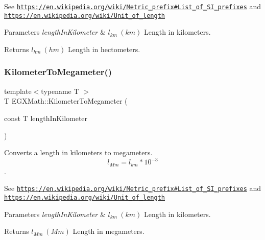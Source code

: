 See \href{https://en.wikipedia.org/wiki/Metric_prefix#List_of_SI_prefixes}{\tt https\+://en.\+wikipedia.\+org/wiki/\+Metric\+\_\+prefix\#\+List\+\_\+of\+\_\+\+S\+I\+\_\+prefixes} and \href{https://en.wikipedia.org/wiki/Unit_of_length}{\tt https\+://en.\+wikipedia.\+org/wiki/\+Unit\+\_\+of\+\_\+length} 
\begin{DoxyParams}{Parameters}
{\em length\+In\+Kilometer} & $ l_{km}\ (km)$ Length in kilometers. \\
\hline
\end{DoxyParams}
\begin{DoxyReturn}{Returns}
$ l_{hm}\ (hm)$ Length in hectometers. 
\end{DoxyReturn}
\mbox{\label{group___e_g_x_math-_conversions-_length_conversions-_s_i-_kilometer-_s_i_gacfeaef9cf345a9907addb7989eb11034}} 
\subsubsection{\texorpdfstring{Kilometer\+To\+Megameter()}{KilometerToMegameter()}}
{\footnotesize\ttfamily template$<$typename T $>$ \\
T E\+G\+X\+Math\+::\+Kilometer\+To\+Megameter (\begin{DoxyParamCaption}\item[{const T}]{length\+In\+Kilometer }\end{DoxyParamCaption})}



Converts a length in kilometers to megameters. \[ l_{Mm}=l_{km} * 10^{-3} \]. 

See \href{https://en.wikipedia.org/wiki/Metric_prefix#List_of_SI_prefixes}{\tt https\+://en.\+wikipedia.\+org/wiki/\+Metric\+\_\+prefix\#\+List\+\_\+of\+\_\+\+S\+I\+\_\+prefixes} and \href{https://en.wikipedia.org/wiki/Unit_of_length}{\tt https\+://en.\+wikipedia.\+org/wiki/\+Unit\+\_\+of\+\_\+length} 
\begin{DoxyParams}{Parameters}
{\em length\+In\+Kilometer} & $ l_{km}\ (km)$ Length in kilometers. \\
\hline
\end{DoxyParams}
\begin{DoxyReturn}{Returns}
$ l_{Mm}\ (Mm)$ Length in megameters. 
\end{DoxyReturn}
\mbox{\label{group___e_g_x_math-_conversions-_length_conversions-_s_i-_kilometer-_s_i_ga0c3c04124b670e73baa39fb7c9ed5846}} 
